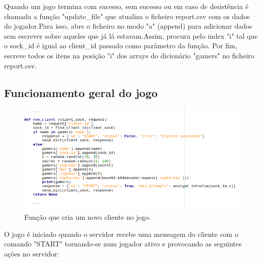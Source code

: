 \documentclass{report}
\begin{document}
Quando um jogo termina com sucesso, sem sucesso ou em caso de desistência é chamada a função "update\_file" que atualiza o ficheiro report.csv com os dados do jogador.Para isso, abre o ficheiro no modo "a" (append) para adicionar dados sem escrever sobre aqueles que já lá estavam.Assim, procura pelo index "i" tal que o sock\_id é igual ao client\_id passado como parâmetro da função. Por fim, escreve todos os itens na posição "i" dos arrays do dicionário "gamers" no ficheiro report.csv. 

\subsection{Funcionamento geral do jogo}
\begin{figure}[H]
        \centering
        \includegraphics[scale=0.65]{new_client}        
        \caption{Função que cria um novo cliente no jogo.}
\end{figure}
O jogo é iniciado quando o servidor recebe uma mensagem do cliente com o comando "START" tornando-se num jogador ativo e provocando as seguintes ações no servidor:
\end{document}
